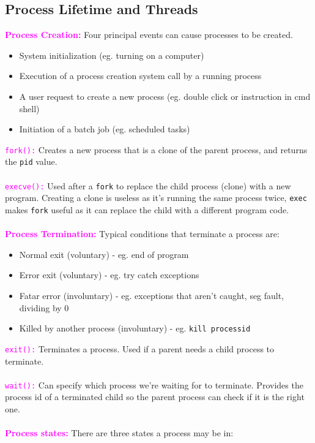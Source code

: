 \documentclass[a4paper,10pt]{article}
\begin{document}
\subsection{Process Lifetime and Threads}
\textcolor{Magenta}{\textbf{Process Creation:}} Four principal events can cause processes to be created. 
\begin{itemize}
\item System initialization (eg. turning on a computer)
\item Execution of a process creation system call by a running process 
\item A user request to create a new process (eg. double click or instruction in cmd shell)
\item Initiation of a batch job (eg. scheduled tasks)
\end{itemize}
\textcolor{Magenta}{\texttt{fork():}} Creates a new process that is a clone of the parent process, and returns the \texttt{pid} value. \\\\
\textcolor{Magenta}{\texttt{execve():}} Used after a \texttt{fork} to replace the child process (clone) with a new program. Creating a clone is useless as it's running the same process twice, \texttt{exec} makes \texttt{fork} useful as it can replace the child with a different program code. \\\\
\textcolor{Magenta}{\textbf{Process Termination:}} Typical conditions that terminate a process are: 
\begin{itemize}
\item Normal exit (voluntary) - eg. end of program
\item Error exit (voluntary) - eg. try catch exceptions
\item Fatar error (involuntary) - eg. exceptions that aren't caught, seg fault, dividing by 0
\item Killed by another process (involuntary) - eg. \texttt{kill processid} 
\end{itemize}
\textcolor{Magenta}{\texttt{exit():}} Terminates a process. Used if a parent needs a child process to terminate.  \\\\
\textcolor{Magenta}{\texttt{wait():}} Can specify which process we're waiting for to terminate. Provides the process id of a terminated child so the parent process can check if it is the right one. \\\\
\newpage
\noindent \textcolor{Magenta}{\textbf{Process states:}} There are three states a process may be in: 
\end{document}
